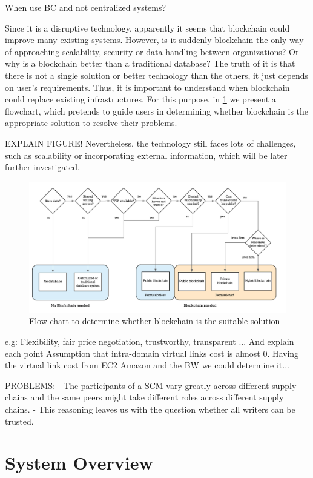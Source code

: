 When use BC and not centralized systems? 

Since it is a disruptive technology, apparently it seems that blockchain could improve many existing systems. However, is it suddenly blockchain the only way of approaching scalability, security or data handling between organizations? Or why is a blockchain better than a traditional database? The truth of it is that there is not a single solution or better technology than the others, it just depends on user's requirements. Thus, it is important to understand when blockchain could replace existing infrastructures. For this purpose, in \ref{fig:bcFlowchart} we present a flowchart, which pretends to guide users in determining whether blockchain is the appropriate solution to resolve their problems.

EXPLAIN FIGURE!
Nevertheless, the technology still faces lots of challenges, such as scalability or incorporating external information, which will be later further investigated.
\begin{figure}[bth]
	\centering
	\includegraphics[width=1\linewidth]{gfx/bcFlowchart}    
  	\caption{Flow-chart to determine whether blockchain is the suitable solution \citep{wust2017you}}
  	\label{fig:bcFlowchart}
\end{figure}

e.g: Flexibility, fair price negotiation, trustworthy, transparent ... And explain each point
Assumption that intra-domain virtual links cost is almost 0. Having the virtual link cost from EC2 Amazon and the BW we could determine it...

PROBLEMS: -  The participants of a SCM vary greatly across different supply
chains and the same peers might take different roles across different supply chains. - This reasoning leaves us with the question whether all writers
can be trusted. 

\section{System Overview}

